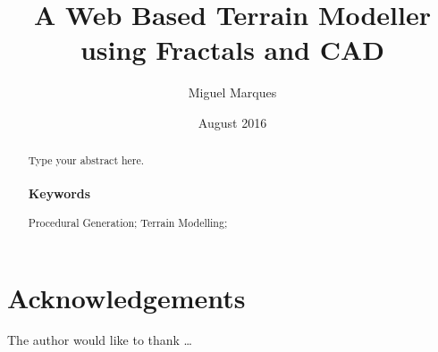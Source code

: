 \documentclass[12pt, oneside]{book}
\title{A Web Based Terrain Modeller using Fractals and CAD}
\author{Miguel Marques}
\date{August 2016}
\begin{document}
%
%

\frontmatter

\maketitle

\pagestyle{plain}

\begin{abstract}
    Type your abstract here.

	\subsubsection*{Keywords}
	Procedural Generation; Terrain Modelling; 
\end{abstract}

\chapter{Acknowledgements}
The author would like to thank \dots

\sstableofcontents

\sslistoffigures

\sslistoftables

\sslistofequations

\begin{listofabbreviations}
\end{listofabbreviations}


%
%
\mainmatter








\begin{references}
	
\end{references}
\end{document}
